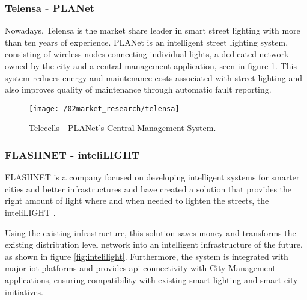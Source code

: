 
\subsubsection{Telensa - PLANet}

Nowadays, Telensa is the market share leader in smart street lighting with more than ten years of experience.\cite{telensa} PLANet is an intelligent street lighting system, consisting of wireless nodes connecting individual lights, a dedicated network owned by the city and a central management application, seen in figure \ref{fig:telensa}. This system reduces energy and maintenance costs associated with street lighting and also improves quality of maintenance through automatic fault reporting.
%
%

\begin{figure}[ht]
	\centering
	\texttt{[image: /02market\_research/telensa]}
	\caption{Telecells - PLANet's Central Management System.}
	\label{fig:telensa}
\end{figure}

\subsubsection{FLASHNET - inteliLIGHT}
FLASHNET is a company focused on developing intelligent systems for smarter cities and better infrastructures and have created a solution that provides the right amount of light where and when needed to lighten the streets, the inteliLIGHT \cite{inteli_light}.

Using the existing infrastructure, this solution saves money and transforms the existing distribution level network into an intelligent infrastructure of the future, as shown in figure \ref{fig:intelilight}. Furthermore, the system is integrated with major \ac{iot} platforms and provides \ac{api} connectivity with City Management applications, ensuring compatibility with existing smart lighting and smart city initiatives.

